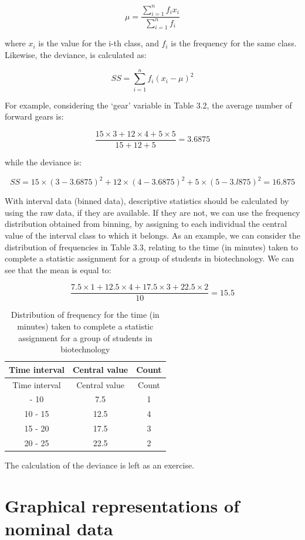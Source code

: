 \documentclass[
  letterpaper,
  DIV=11,
  numbers=noendperiod]{scrreprt}
\begin{document}
\[\mu = \frac{\sum\limits_{i = 1}^n f_i x_i}{\sum\limits_{i = 1}^n f_i}\]

where \(x_i\) is the value for the i-th class, and \(f_i\) is the
frequency for the same class. Likewise, the deviance, is calculated as:

\[SS = \sum\limits_{i = 1}^n f_i (x_i - \mu)^2\]

For example, considering the `gear' variable in Table 3.2, the average
number of forward gears is:

\[\frac{ 15 \times 3 + 12 \times 4 + 5 \times 5}{15 + 12 + 5} = 3.6875\]

while the deviance is:

\[SS = 15 \times (3 - 3.6875)^2 + 12 \times (4 - 3.6875)^2 + 5 \times (5 - 3.l875)^2 = 16.875\]

With interval data (binned data), descriptive statistics should be
calculated by using the raw data, if they are available. If they are
not, we can use the frequency distribution obtained from binning, by
assigning to each individual the central value of the interval class to
which it belongs. As an example, we can consider the distribution of
frequencies in Table 3.3, relating to the time (in minutes) taken to
complete a statistic assignment for a group of students in
biotechnology. We can see that the mean is equal to:

\[\frac{7.5 \times 1 + 12.5 \times 4 + 17.5 \times 3 + 22.5 \times 2}{10} = 15.5\]

\begin{longtable}[]{@{}ccc@{}}
\caption{Distribution of frequency for the time (in minutes) taken to
complete a statistic assignment for a group of students in
biotechnology}\tabularnewline
\toprule\noalign{}
Time interval & Central value & Count \\
\midrule\noalign{}
\endfirsthead
\toprule\noalign{}
Time interval & Central value & Count \\
\midrule\noalign{}
\endhead
\bottomrule\noalign{}
\endlastfoot
5 - 10 & 7.5 & 1 \\
10 - 15 & 12.5 & 4 \\
15 - 20 & 17.5 & 3 \\
20 - 25 & 22.5 & 2 \\
\end{longtable}

The calculation of the deviance is left as an exercise.

\section{Graphical representations of nominal
data}\label{graphical-representations-of-nominal-data}
\end{document}
